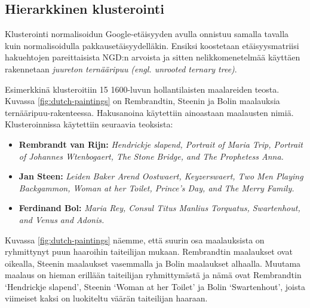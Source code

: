\documentclass[12pt,finnish,final]{tktltiki2}
\theoremstyle{definition}
\theoremstyle{remark}
\newcommand{\engl}[1]{\emph{(engl. #1)}}
\begin{document}
    \subsection{Hierarkkinen klusterointi} %
    \label{sub:klusterointi}
      Klusterointi normalisoidun Google-etäisyyden avulla onnistuu samalla tavalla kuin normalisoidulla pakkausetäisyydelläkin. Ensiksi koostetaan etäisyysmatriisi hakuehtojen pareittaisista NGD:n arvoista ja sitten nelikkomenetelmää käyttäen rakennetaan \emph{juureton ternääripuu} \engl{unrooted ternary tree}.

      Esimerkkinä klusteroitiin 15 1600-luvun hollantilaisten maalareiden teosta.
      Kuvassa \ref{fig:dutch-paintings} on Rembrandtin, Steenin ja Bolin maalauksia ternääripuu-rakenteessa.
      Hakusanoina käytettiin ainoastaan maalausten nimiä. Klusteroinnissa käytettiin seuraavia teoksista:

      \begin{itemize}
        \item \textbf{Rembrandt van Rijn:} \emph{Hendrickje slapend, Portrait of Maria Trip, Portrait of Johannes Wtenbogaert, The Stone Bridge, and The Prophetess Anna.}
        \item \textbf{Jan Steen:} \emph{Leiden Baker Arend Oostwaert, Keyzerswaert, Two Men Playing Backgammon, Woman at her Toilet, Prince’s Day, and The Merry Family.}
        \item \textbf{Ferdinand Bol:} \emph{Maria Rey, Consul Titus Manlius Torquatus, Swartenhout, and Venus and Adonis.}
      \end{itemize}

      Kuvassa \ref{fig:dutch-paintings} näemme, että suurin osa maalauksista on ryhmittynyt puun haaroihin taiteilijan mukaan. Rembrandtin maalaukset ovat oikealla, Steenin maalaukset vasemmalla ja Bolin maalaukset alhaalla. Muutama maalaus on hieman erillään taiteilijan ryhmittymästä ja nämä ovat Rembrandtin `Hendrickje slapend', Steenin `Woman at her Toilet' ja  Bolin `Swartenhout', joista viimeiset kaksi on luokiteltu väärän taiteilijan haaraan.
\end{document}
